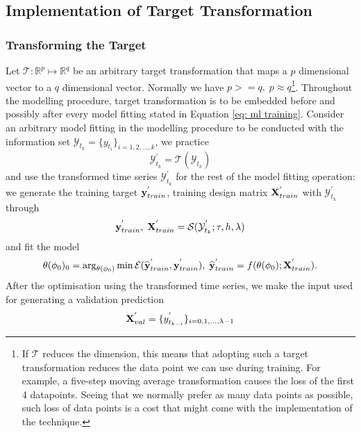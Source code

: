 \subsection{Implementation of Target Transformation}\label{subsec: target transformation procedure}

\subsubsection{Transforming the Target}
Let $\mathcal{T}: \mathbb{R}^p \longmapsto \mathbb{R}^q$ be an arbitrary target transformation that maps a $p$ dimensional vector to a $q$ dimensional vector. Normally we have $p >= q, \; p \approx q$\footnote{If $\mathcal{T}$ reduces the dimension, this means that adopting such a target transformation reduces the data point we can use during training. For example, a five-step moving average transformation causes the loss of the first 4 datapoints. Seeing that we normally prefer as many data points as possible, such loss of data points is a cost that might come with the implementation of the technique.}. Throughout the modelling procedure, target transformation is to be embedded before and possibly after every model fitting stated in Equation \ref{eq: ml training}. Consider an arbitrary model fitting in the modelling procedure to be conducted with the information set $\mathcal{Y}_{t_k} = \{ y_{t_i} \}_{i = 1, 2, \ldots, k}$, we practice
\begin{equation*}
    \mathcal{Y}^{'}_{t_k} = \mathcal{T}(\mathcal{Y}_{t_k})
\end{equation*}
and use the transformed time series $\mathcal{Y}^{'}_{t_k}$ for the rest of the model fitting operation: we generate the training target $\mathbf{y}^{'}_{train}$, training design matrix $\mathbf{X}^{'}_{train}$ with $\mathcal{Y}^{'}_{t_k}$ through
\begin{equation*}
    \mathbf{y}^{'}_{train}, \; \mathbf{X}^{'}_{train} = \mathcal{S}(\mathcal{Y}^{'}_{t_k}; \tau, h, \lambda)
\end{equation*}
and fit the model
\begin{equation*}
    \theta(\phi_0)_0 = \arg_{\theta(\phi_0)} \min \mathcal{E}(\widehat{\mathbf{y}}^{'}_{train}, \mathbf{y}^{'}_{train}), \; \widehat{\mathbf{y}}^{'}_{train} = f(\theta(\phi_0); \mathbf{X}^{'}_{train}).
\end{equation*}
After the optimisation using the transformed time series, we make the input used for generating a validation prediction
\begin{equation*}
    \mathbf{X}^{'}_{val} = \{y^{'}_{t_{k-i}} \}_{i = 0, 1, \ldots, \lambda-1}
\end{equation*}
